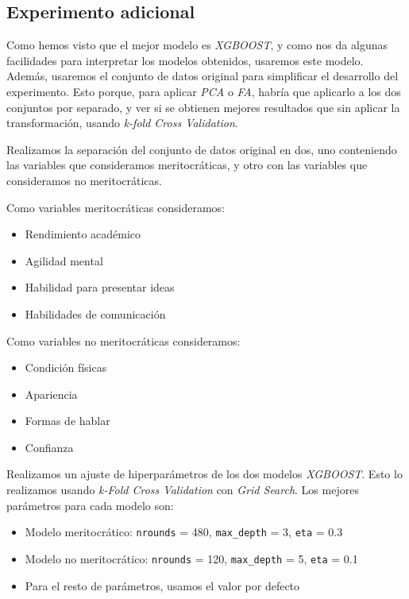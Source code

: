 \subsection{Experimento adicional}

Como hemos visto que el mejor modelo es \textit{XGBOOST}, y como nos da algunas facilidades para interpretar los modelos obtenidos, usaremos este modelo. Además, usaremos el conjunto de datos original para simplificar el desarrollo del experimento. Esto porque, para aplicar \textit{PCA} o \textit{FA}, habría que aplicarlo a los dos conjuntos por separado, y ver si se obtienen mejores resultados que sin aplicar la transformación, usando \textit{k-fold Cross Validation}.

Realizamos la separación del conjunto de datos original en dos, uno conteniendo las variables que consideramos meritocráticas, y otro con las variables que consideramos no meritocráticas.

Como variables meritocráticas consideramos:

\begin{itemize}
    \item Rendimiento académico
    \item Agilidad mental
    \item Habilidad para presentar ideas
    \item Habilidades de comunicación
\end{itemize}

Como variables no meritocráticas consideramos:
\begin{itemize}
    \item Condición físicas
    \item Apariencia
    \item Formas de hablar
    \item Confianza
\end{itemize}

Realizamos un ajuste de hiperparámetros de los dos modelos \textit{XGBOOST}. Esto lo realizamos usando \textit{k-Fold Cross Validation} con \textit{Grid Search}. Los mejores parámetros para cada modelo son:

\begin{itemize}
    \item Modelo meritocrático: \lstinline{nrounds} = 480, \lstinline{max_depth} = 3, \lstinline{eta} = 0.3
    \item Modelo no meritocrático: \lstinline{nrounds} = 120, \lstinline{max_depth} = 5, \lstinline{eta} = 0.1
    \item Para el resto de parámetros, usamos el valor por defecto
\end{itemize}


